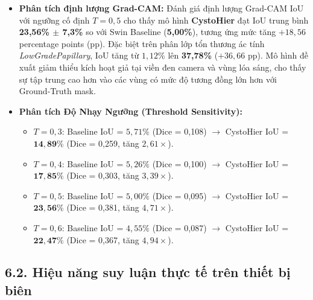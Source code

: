 \documentclass[
  10pt,
  a4paper,
  twocolumn]{article}
\providecommand{\tightlist}{%
  \setlength{\itemsep}{0pt}\setlength{\parskip}{0pt}}
\begin{document}
\begin{itemize}
\tightlist
\item
  \textbf{Phân tích định lượng Grad-CAM:} Đánh giá định lượng Grad-CAM
  IoU với ngưỡng cố định \(T=0{,}5\) cho thấy mô hình \textbf{CystoHier}
  đạt IoU trung bình \textbf{23,56\% \(\pm\) 7,3\%} so với Swin Baseline
  (\textbf{5,00\%}), tương ứng mức tăng \(+18{,}56\) percentage points
  (pp). Đặc biệt trên phân lớp tổn thương ác tính
  \emph{Low\allowbreak{}Grade\allowbreak{}Papillary}, IoU tăng từ \(1{,}12\%\) lên
  \textbf{37,78\%} (\(+36{,}66\) pp). Mô hình đề xuất giảm thiểu kích
  hoạt giả tại viền đen camera và vùng lóa sáng, cho thấy sự tập trung
  cao hơn vào các vùng có mức độ tương đồng lớn hơn với Ground-Truth
  mask.
\item
  \textbf{Phân tích Độ Nhạy Ngưỡng (Threshold Sensitivity):}

  \begin{itemize}
  \tightlist
  \item
    \(T=0{,}3\): Baseline IoU = \(5{,}71\%\) (Dice = 0,108) \(\to\)
    CystoHier IoU = \(\mathbf{14{,}89\%}\) (Dice = 0,259, tăng
    \(2{,}61\times\)).
  \item
    \(T=0{,}4\): Baseline IoU = \(5{,}26\%\) (Dice = 0,100) \(\to\)
    CystoHier IoU = \(\mathbf{17{,}85\%}\) (Dice = 0,303, tăng
    \(3{,}39\times\)).
  \item
    \(T=0{,}5\): Baseline IoU = \(5{,}00\%\) (Dice = 0,095) \(\to\)
    CystoHier IoU = \(\mathbf{23{,}56\%}\) (Dice = 0,381, tăng
    \(4{,}71\times\)).
  \item
    \(T=0{,}6\): Baseline IoU = \(4{,}55\%\) (Dice = 0,087) \(\to\)
    CystoHier IoU = \(\mathbf{22{,}47\%}\) (Dice = 0,367, tăng
    \(4{,}94\times\)).
  \end{itemize}
\end{itemize}

\subsection{6.2. Hiệu năng suy luận thực tế trên thiết bị
biên}\label{hiux1ec7u-nux103ng-suy-luux1eadn-thux1ef1c-tux1ebf-truxean-thiux1ebft-bux1ecb-biuxean}
\end{document}
